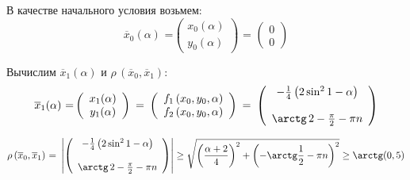 \documentclass[a4paper,12pt]{article}
\begin{document}
В качестве начального условия возьмем:
\begin{equation}\label{eq:x0}
    \text{$\overline{x}_0(\alpha)$ =}
        \left(\begin{array}{c}
            x_0(\alpha)\\
            y_0(\alpha)
        \end{array}\right)
    \text{ = }
        \left(\begin{array}{c}
            0\\        
            0
        \end{array}\right) 
\end{equation}

Вычислим $\overline{x}_1(\alpha)$ и $\rho\,(\overline{x}_0, \overline{x}_1)$:
\begin{equation}\begin{split}\label{eq:x1}
    \text{$\overline{x}_1(\alpha)$ =}
        \left(\begin{array}{c}
            x_1(\alpha)\\         
            y_1(\alpha)
        \end{array}\right)
    \text{ = }
        \left(\begin{array}{c}
            f_1\,(x_0, y_0, \alpha)\\        
            f_2\,(x_0, y_0, \alpha)
        \end{array}\right) 
    \text{ = }
        \left(\begin{array}{c}
            -\frac14 \left( 2\sin^21 - \alpha\right)\\\\      
            \arctg\,2 - \frac\pi2 - \pi n
        \end{array}\right) 
\end{split}\end{equation}
\par\medskip
\begin{equation}\label{eq:ro}
    \text{$\rho\,(\overline{x}_0, \overline{x}_1)$ = }
        \left|\left(\begin{array}{c}
            -\frac14 \left( 2\sin^21 - \alpha\right)\\\\      
            \arctg\,2 - \frac\pi2 - \pi n
        \end{array}\right)\right|
    \geq \sqrt{\left(\frac{\alpha+2}4\right)^2 + 
    \left( -\arctg\frac12 - \pi n \right)^2} \geq 
    \arctg(0,5)
\end{equation}
\par\bigskip
\end{document}
